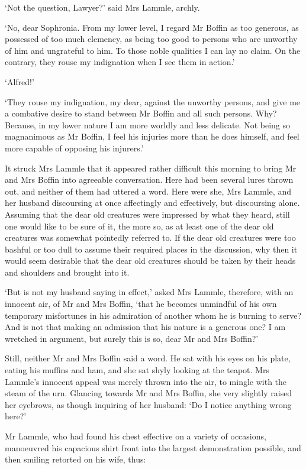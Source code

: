 ‘Not the question, Lawyer?’ said Mrs Lammle, archly.

‘No, dear Sophronia. From my lower level, I regard Mr Boffin as too
generous, as possessed of too much clemency, as being too good to
persons who are unworthy of him and ungrateful to him. To those noble
qualities I can lay no claim. On the contrary, they rouse my indignation
when I see them in action.’

‘Alfred!’

‘They rouse my indignation, my dear, against the unworthy persons,
and give me a combative desire to stand between Mr Boffin and all such
persons. Why? Because, in my lower nature I am more worldly and less
delicate. Not being so magnanimous as Mr Boffin, I feel his injuries
more than he does himself, and feel more capable of opposing his
injurers.’

It struck Mrs Lammle that it appeared rather difficult this morning
to bring Mr and Mrs Boffin into agreeable conversation. Here had been
several lures thrown out, and neither of them had uttered a word. Here
were she, Mrs Lammle, and her husband discoursing at once affectingly
and effectively, but discoursing alone. Assuming that the dear old
creatures were impressed by what they heard, still one would like to be
sure of it, the more so, as at least one of the dear old creatures
was somewhat pointedly referred to. If the dear old creatures were too
bashful or too dull to assume their required places in the discussion,
why then it would seem desirable that the dear old creatures should be
taken by their heads and shoulders and brought into it.

‘But is not my husband saying in effect,’ asked Mrs Lammle, therefore,
with an innocent air, of Mr and Mrs Boffin, ‘that he becomes unmindful
of his own temporary misfortunes in his admiration of another whom he is
burning to serve? And is not that making an admission that his nature is
a generous one? I am wretched in argument, but surely this is so, dear
Mr and Mrs Boffin?’

Still, neither Mr and Mrs Boffin said a word. He sat with his eyes on
his plate, eating his muffins and ham, and she sat shyly looking at the
teapot. Mrs Lammle’s innocent appeal was merely thrown into the air, to
mingle with the steam of the urn. Glancing towards Mr and Mrs Boffin,
she very slightly raised her eyebrows, as though inquiring of her
husband: ‘Do I notice anything wrong here?’

Mr Lammle, who had found his chest effective on a variety of occasions,
manoeuvred his capacious shirt front into the largest demonstration
possible, and then smiling retorted on his wife, thus:

